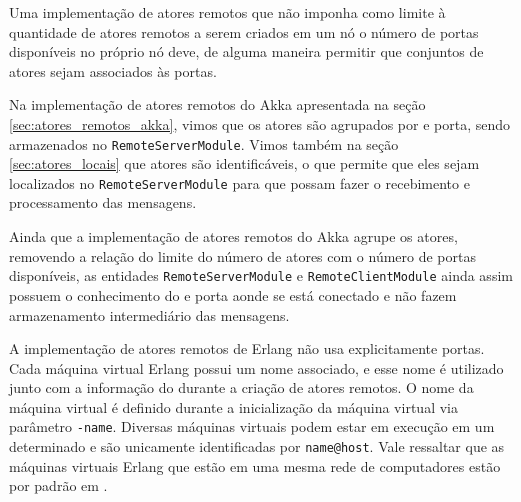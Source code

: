 Uma implementação de atores remotos que não imponha como limite à quantidade
de atores remotos a serem criados em um nó o número de portas disponíveis no
próprio nó deve, de alguma maneira permitir que conjuntos de atores sejam
associados às portas.

Na implementação de atores remotos do Akka apresentada na seção 
\ref{sec:atores_remotos_akka}, vimos que os atores são agrupados por
 e porta, sendo armazenados no \lstinline$RemoteServerModule$. 
Vimos também na seção \ref{sec:atores_locais} que atores são identificáveis, 
o que permite que eles sejam localizados no \lstinline$RemoteServerModule$ 
para que possam fazer o recebimento e processamento das mensagens. 

Ainda que a implementação de atores remotos do Akka agrupe
os atores, removendo a relação do limite do número de atores com o 
número de portas disponíveis, as entidades \lstinline$RemoteServerModule$ 
e \lstinline$RemoteClientModule$ ainda assim possuem o conhecimento 
do  e porta aonde se está conectado e não fazem armazenamento
intermediário das mensagens.

A implementação de atores remotos de Erlang não usa explicitamente portas. 
Cada máquina virtual Erlang possui um nome associado, e esse nome é utilizado
junto com a informação do  durante a criação de atores remotos.
O nome da máquina virtual é definido durante a inicialização da máquina virtual
via parâmetro \lstinline$-name$. Diversas máquinas virtuais podem estar em
execução em um determinado  e são unicamente identificadas
por \lstinline$name@host$. Vale ressaltar que as máquinas virtuais Erlang
que estão em uma mesma rede de computadores estão por padrão em .
